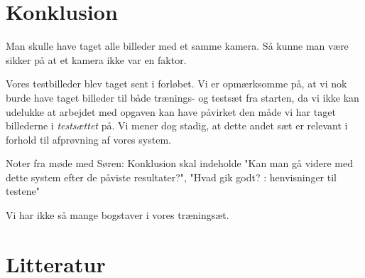 \documentclass[11pt,a4paper,final]{article}
\begin{document}
\section{Konklusion}
Man skulle have taget alle billeder med et samme kamera. Så kunne man være sikker på at et kamera ikke var en faktor.

Vores testbilleder blev taget sent i forløbet. Vi er opmærksomme på, at vi nok burde have taget  billeder til både trænings- og testsæt fra starten, da vi ikke kan udelukke at arbejdet med opgaven kan have påvirket den måde vi har taget billederne i \textit{testsættet} på. Vi mener dog stadig, at dette andet sæt er relevant i forhold til afprøvning af vores system.

Noter fra møde med Søren: Konklusion skal indeholde "Kan man gå videre med dette system efter de påviste resultater?", "Hvad gik godt? : henvisninger til testene"

Vi har ikke så mange bogstaver i vores træningsæt.

\newpage %
%
\section{Litteratur}
\end{document}
